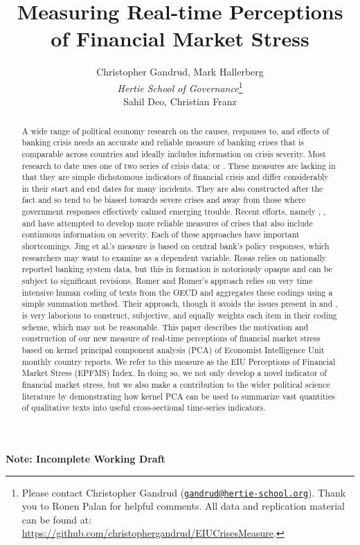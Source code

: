 \documentclass[]{article}
\title{Measuring Real-time Perceptions of Financial Market Stress}
\author{Christopher Gandrud, Mark Hallerberg \\ \emph{Hertie School of Governance}\footnote{Please contact Christopher Gandrud
(\href{mailto:gandrud@hertie-school.org}{\nolinkurl{gandrud@hertie-school.org}}).
Thank you to Ronen Palan for helpful comments. All data and
replication material can be found at:
\url{https://github.com/christophergandrud/EIUCrisesMeasure}.} \\
Sahil Deo, Christian Franz}
\begin{document}
\maketitle


\textbf{Note: Incomplete Working Draft}

\begin{abstract}
A wide range of political economy research on the causes, responses to, and effects of banking crisis needs an accurate and reliable measure of banking crises that is comparable across countries and ideally includes information on crisis severity. Most research to date uses one of two series of crisis data: \cite{Reinhart2009} or \cite{laeven2013}. These measures are lacking in that they are simple dichotomous indicators of financial crisis and differ considerably in their start and end dates for many incidents. They are also constructed after the fact and so tend to be biased towards severe crises and away from those where government responses effectively calmed emerging trouble. Recent efforts, namely \cite{Jing2015}, \cite{Rosas2009}, and \cite{Romer2015} have attempted to develop more reliable measures of crises that also include continuous information on severity. Each of these approaches have important shortcomings. Jing et al.’s measure is based on central bank’s policy responses, which researchers may want to examine as a dependent variable. Rosas relies on nationally reported banking system data, but this in formation is notoriously opaque \citep{gandrud2015does} and can be subject to significant revisions. Romer and Romer’s approach relies on very time intensive human coding of texts from the OECD and aggregates these codings using a simple summation method. Their approach, though it avoids the issues present in \cite{Jing2015} and \cite{Rosas2009}, is very laborious to construct, subjective, and equally weights each item in their coding scheme, which may not be reasonable. This paper describes the motivation and construction of our new measure of real-time perceptions of financial market stress based on kernel principal component analysis (PCA) of Economist Intelligence Unit monthly country reports. We refer to this measure as the EIU Perceptions of Financial Market Stress (EPFMS) Index. In doing so, we not only develop a novel indicator of financial market stress, but we also make a contribution to the wider political science literature by demonstrating how kernel PCA can be used to summarize vast quantities of qualitative texts into useful cross-sectional time-series indicators.
\end{abstract}
\end{document}
